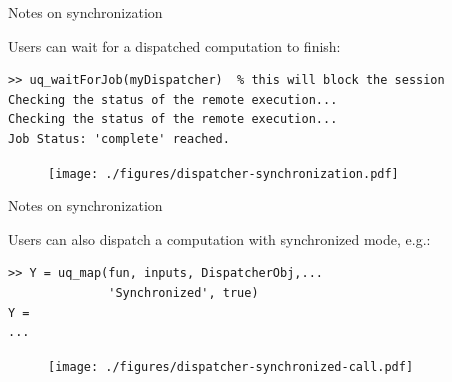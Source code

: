 \documentclass[]{rsuqbeamernew}
\begin{document}
\begin{frame}[fragile]{Notes on synchronization}

Users can wait for a dispatched computation to finish:
\begin{lstlisting}[numbers=none]
>> uq_waitForJob(myDispatcher)  % this will block the session
Checking the status of the remote execution...
Checking the status of the remote execution...
Job Status: 'complete' reached.
\end{lstlisting}
\begin{figure}[htbp]
    \centering
    \texttt{[image: ./figures/dispatcher-synchronization.pdf]}
\end{figure}

\end{frame}

\begin{frame}[fragile]{Notes on synchronization}

Users can also dispatch a computation with {\altx synchronized} mode, e.g.:
\begin{lstlisting}[numbers=none]
>> Y = uq_map(fun, inputs, DispatcherObj,...
              'Synchronized', true)
Y = 
...
\end{lstlisting}
\begin{figure}[htbp]
    \centering
    \texttt{[image: ./figures/dispatcher-synchronized-call.pdf]}
\end{figure}
  
\end{frame}
\end{document}
